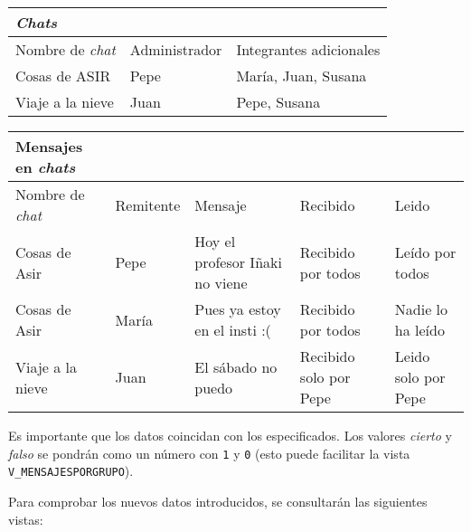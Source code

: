 \documentclass[a4paper]{article}
\begin{document}
\begin{center}
\begin{tabular}{|l|l|l|}
\hline
\textbf{\emph{Chats}} &  & \\[0pt]
\hline
Nombre de \emph{chat} & Administrador & Integrantes adicionales\\[0pt]
Cosas de ASIR & Pepe & María, Juan, Susana\\[0pt]
Viaje a la nieve & Juan & Pepe, Susana\\[0pt]
\hline
\end{tabular}
\end{center}

\begin{center}
\begin{tabular}{|l|l|l|l|l|}
\hline
\textbf{Mensajes en \emph{chats}} &  &  &  & \\[0pt]
\hline
Nombre de \emph{chat} & Remitente & Mensaje & Recibido & Leido\\[0pt]
Cosas de Asir & Pepe & Hoy el profesor Iñaki no viene & Recibido por todos & Leído por todos\\[0pt]
Cosas de Asir & María & Pues ya estoy en el insti :( & Recibido por todos & Nadie lo ha leído\\[0pt]
Viaje a la nieve & Juan & El sábado no puedo & Recibido solo por Pepe & Leido solo por Pepe\\[0pt]
\hline
\end{tabular}
\end{center}

Es importante que los datos coincidan con los especificados. Los valores \emph{cierto} y \emph{falso} se pondrán como un número con \texttt{1} y \texttt{0} (esto puede facilitar la vista \texttt{V\_MENSAJESPORGRUPO}).


Para comprobar los nuevos datos introducidos, se consultarán las siguientes vistas:
\end{document}
